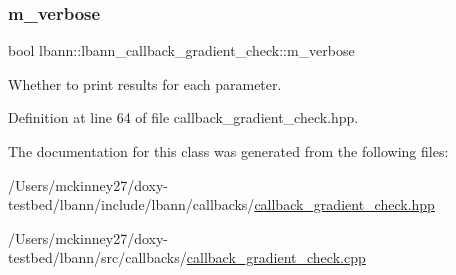 \mbox{\label{classlbann_1_1lbann__callback__gradient__check_a9a8669004ccfc3b76963ba13252600d3}} 
\subsubsection{\texorpdfstring{m\+\_\+verbose}{m\_verbose}}
{\footnotesize\ttfamily bool lbann\+::lbann\+\_\+callback\+\_\+gradient\+\_\+check\+::m\+\_\+verbose\hspace{0.3cm}{\ttfamily [private]}}

Whether to print results for each parameter. 

Definition at line 64 of file callback\+\_\+gradient\+\_\+check.\+hpp.



The documentation for this class was generated from the following files\+:\begin{DoxyCompactItemize}
\item 
/\+Users/mckinney27/doxy-\/testbed/lbann/include/lbann/callbacks/\hyperlink{callback__gradient__check_8hpp}{callback\+\_\+gradient\+\_\+check.\+hpp}\item 
/\+Users/mckinney27/doxy-\/testbed/lbann/src/callbacks/\hyperlink{callback__gradient__check_8cpp}{callback\+\_\+gradient\+\_\+check.\+cpp}\end{DoxyCompactItemize}
